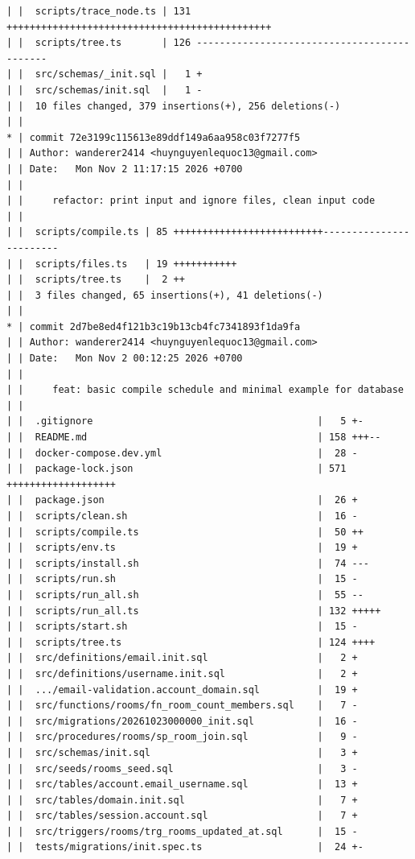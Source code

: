 \documentclass[12pt]{article}
\begin{document}
\begin{lstlisting}[numbers=none,breaklines=true]
| |  scripts/trace_node.ts | 131 ++++++++++++++++++++++++++++++++++++++++++++++
| |  scripts/tree.ts       | 126 --------------------------------------------
| |  src/schemas/_init.sql |   1 +
| |  src/schemas/init.sql  |   1 -
| |  10 files changed, 379 insertions(+), 256 deletions(-)
| |
* | commit 72e3199c115613e89ddf149a6aa958c03f7277f5
| | Author: wanderer2414 <huynguyenlequoc13@gmail.com>
| | Date:   Mon Nov 2 11:17:15 2026 +0700
| |
| |     refactor: print input and ignore files, clean input code
| |
| |  scripts/compile.ts | 85 ++++++++++++++++++++++++++------------------------
| |  scripts/files.ts   | 19 +++++++++++
| |  scripts/tree.ts    |  2 ++
| |  3 files changed, 65 insertions(+), 41 deletions(-)
| |
* | commit 2d7be8ed4f121b3c19b13cb4fc7341893f1da9fa
| | Author: wanderer2414 <huynguyenlequoc13@gmail.com>
| | Date:   Mon Nov 2 00:12:25 2026 +0700
| |
| |     feat: basic compile schedule and minimal example for database
| |
| |  .gitignore                                       |   5 +-
| |  README.md                                        | 158 +++--
| |  docker-compose.dev.yml                           |  28 -
| |  package-lock.json                                | 571 +++++++++++++++++++
| |  package.json                                     |  26 +
| |  scripts/clean.sh                                 |  16 -
| |  scripts/compile.ts                               |  50 ++
| |  scripts/env.ts                                   |  19 +
| |  scripts/install.sh                               |  74 ---
| |  scripts/run.sh                                   |  15 -
| |  scripts/run_all.sh                               |  55 --
| |  scripts/run_all.ts                               | 132 +++++
| |  scripts/start.sh                                 |  15 -
| |  scripts/tree.ts                                  | 124 ++++
| |  src/definitions/email.init.sql                   |   2 +
| |  src/definitions/username.init.sql                |   2 +
| |  .../email-validation.account_domain.sql          |  19 +
| |  src/functions/rooms/fn_room_count_members.sql    |   7 -
| |  src/migrations/20261023000000_init.sql           |  16 -
| |  src/procedures/rooms/sp_room_join.sql            |   9 -
| |  src/schemas/init.sql                             |   3 +
| |  src/seeds/rooms_seed.sql                         |   3 -
| |  src/tables/account.email_username.sql            |  13 +
| |  src/tables/domain.init.sql                       |   7 +
| |  src/tables/session.account.sql                   |   7 +
| |  src/triggers/rooms/trg_rooms_updated_at.sql      |  15 -
| |  tests/migrations/init.spec.ts                    |  24 +-

\end{lstlisting}
\end{document}
